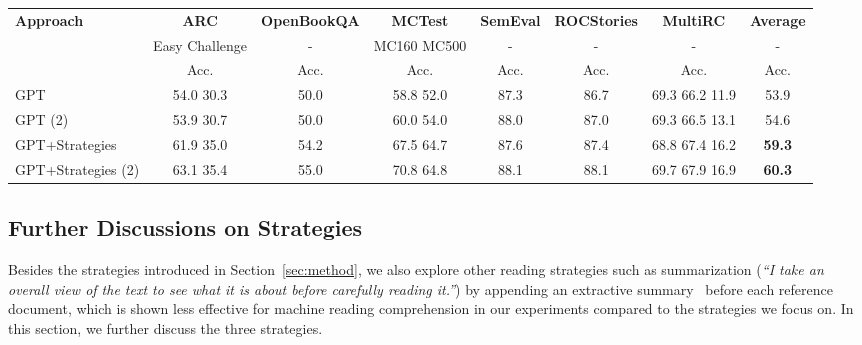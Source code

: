 \documentclass[11pt,a4paper]{article}
\newcommand{\ie}{{i.e.}}
\begin{document}
\begin{table*}[h!]
\scriptsize
\centering
\begin{tabular}{lcccccc|c}
\toprule
\multirow{2}{*}{\bf Approach}     & \bf ARC   & \bf OpenBookQA  & \bf MCTest & \bf SemEval  & \bf ROCStories & \bf MultiRC & \bf Average \\

                     & Easy  Challenge    & - & MC160  MC500   & -            & -  & - & - \\
               & Acc.      & Acc.     & Acc.   & Acc.  & Acc. &     Acc. & Acc. \\
\midrule
GPT   & 54.0  30.3   & 50.0 & 58.8  52.0   & 87.3 & 86.7 & 69.3  66.2  11.9 & 53.9 \\
GPT (2)  & 53.9  30.7 &  50.0 & 60.0  54.0 & 88.0  & 87.0 &  69.3  66.5  13.1 & 54.6 \\
GPT+Strategies  &  61.9  35.0 &  54.2 & 67.5  64.7 &87.6  &87.4 &68.8	 67.4   16.2 & \bf 59.3 \\
GPT+Strategies (2)  &  63.1   35.4  &   55.0 &  70.8   64.8  &  88.1 &  88.1 &   69.7   67.9   16.9 & \bf 60.3 \\
\bottomrule
\end{tabular}
\caption{Performance (\%) on the test sets of ARC, OpenBookQA, MCTest, SemEval-2018 Task 11, and ROCStories and the development set of MultiRC using the target data only (\ie, without the data flow 1 and 2 boxed in Figure~\ref{fig:overview}) (Acc.: Accuracy; : macro-average F1; : micro-average F1; : using the joint exact match accuracy (\ie,  reported by the official evaluation~\cite{khashabi2018looking})). \label{tab:eval:notransfer}}
\end{table*}



\subsection{Further Discussions on Strategies}
\label{sec:eval:other_strategy}


Besides the strategies introduced in Section~\ref{sec:method}, we also explore other reading strategies such as {\sc summarization} (\emph{``I take an overall view of the text to see what it is about before carefully reading it.''}) by appending an extractive summary~\cite{boudin2015concept} before each reference document, which is shown less effective for machine reading comprehension in our experiments compared to the strategies we focus on. In this section, we further discuss the three strategies. 
\end{document}
